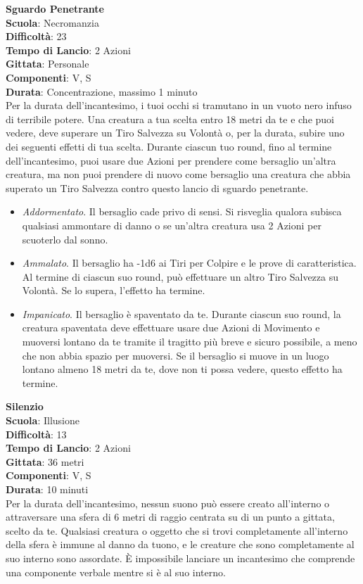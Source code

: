 \begin{multicols}{2}
\medskip\textbf{Sguardo Penetrante}\\
\textbf{Scuola}: Necromanzia\\
\textbf{Difficoltà}: 23\\
\textbf{Tempo di Lancio}: 2 Azioni\\
\textbf{Gittata}: Personale\\
\textbf{Componenti}: V, S\\
\textbf{Durata}: Concentrazione, massimo 1 minuto\\
Per la durata dell'incantesimo, i tuoi occhi si tramutano in un vuoto nero infuso di terribile potere. Una creatura a tua scelta entro 18 metri da te e che puoi vedere, deve superare un Tiro Salvezza su Volontà o, per la durata, subire uno dei seguenti effetti di tua scelta. Durante ciascun tuo round, fino al termine dell'incantesimo, puoi usare due Azioni per prendere come bersaglio un'altra creatura, ma non puoi prendere di nuovo come bersaglio una creatura che abbia superato un Tiro Salvezza contro questo lancio di sguardo penetrante.\\
\medskip
\begin{itemize}
\item
\textit{Addormentato}. Il bersaglio cade privo di sensi. Si risveglia qualora subisca qualsiasi ammontare di danno o se un'altra creatura usa 2 Azioni per scuoterlo dal sonno.
\item
\textit{Ammalato}. Il bersaglio ha -1d6 ai Tiri per Colpire e le prove di caratteristica. Al termine di ciascun suo round, può effettuare un altro Tiro Salvezza su Volontà. Se lo supera, l'effetto ha termine.
\item
\textit{Impanicato}. Il bersaglio è spaventato da te. Durante ciascun suo round, la creatura spaventata deve effettuare usare due Azioni di Movimento e muoversi lontano da te tramite il tragitto più breve e sicuro possibile, a meno che non abbia spazio per muoversi. Se il bersaglio si muove in un luogo lontano almeno 18 metri da te, dove non ti possa vedere, questo effetto ha termine.
\end{itemize}

\medskip\textbf{Silenzio}\\
\textbf{Scuola}: Illusione\\
\textbf{Difficoltà}: 13\\
\textbf{Tempo di Lancio}: 2 Azioni\\
\textbf{Gittata}: 36 metri\\
\textbf{Componenti}: V, S\\
\textbf{Durata}: 10 minuti\\
Per la durata dell'incantesimo, nessun suono può essere creato all'interno o attraversare una sfera di 6 metri di raggio centrata su di un punto a gittata, scelto da te. Qualsiasi creatura o oggetto che si trovi completamente all'interno della sfera è immune al danno da tuono, e le creature che sono completamente al suo interno sono assordate. È impossibile lanciare un incantesimo che comprende una componente verbale mentre si è al suo interno.


\end{multicols}
